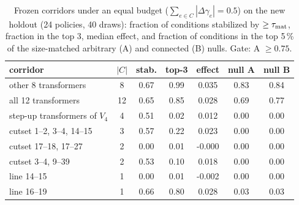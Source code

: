 \begin{table}[!t]
\centering
\caption{Frozen corridors under an equal budget ($\sum_{e\in C}|\Delta\gamma_e|=0.5$) on the new holdout (24 policies, 40 draws): fraction of conditions stabilized by $\ge\tau_{\rm mat}$, fraction in the top 3, median effect, and fraction of conditions in the top 5\,\% of the size-matched arbitrary (A) and connected (B) nulls. Gate: A $\ge0.75$.}\label{tab:corridors}
\scriptsize
\setlength{\tabcolsep}{2.2pt}
\begin{tabular}{@{}L{0.30\columnwidth}cccccc@{}}
\toprule
corridor & $|C|$ & stab. & top-3 & effect & null A & null B \\
\midrule
other 8 transformers & 8 & 0.67 & 0.99 & 0.035 & 0.83 & 0.84 \\
all 12 transformers & 12 & 0.65 & 0.85 & 0.028 & 0.69 & 0.77 \\
step-up transformers of $V_4$ & 4 & 0.51 & 0.02 & 0.012 & 0.00 & 0.00 \\
cutset 1--2, 3--4, 14--15 & 3 & 0.57 & 0.22 & 0.023 & 0.00 & 0.00 \\
cutset 17--18, 17--27 & 2 & 0.00 & 0.01 & -0.000 & 0.00 & 0.00 \\
cutset 3--4, 9--39 & 2 & 0.53 & 0.10 & 0.018 & 0.00 & 0.00 \\
line 14--15 & 1 & 0.00 & 0.01 & -0.002 & 0.00 & 0.00 \\
line 16--19 & 1 & 0.66 & 0.80 & 0.028 & 0.03 & 0.03 \\
\bottomrule
\end{tabular}
\end{table}
